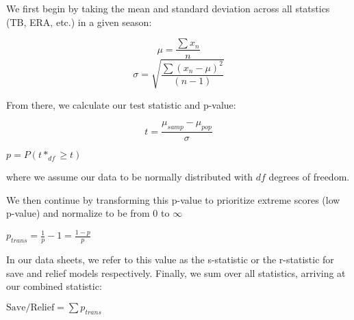 We first begin by taking the mean and standard deviation across all statstics (TB, ERA, etc.) in a given season:

$$\mu = \frac{\sum x_n}{n}$$
$$\sigma = \sqrt{\frac{\sum(x_n-\mu)^2}{(n-1)}}$$

From there, we calculate our test statistic and p-value:

$$t = \frac{\mu_{samp} - \mu_{pop}}{\sigma}$$

$p = P(t*_{df}\geq t)$

where we assume our data to be normally distributed with $df$ degrees of freedom.

We then continue by transforming this p-value to prioritize extreme scores (low p-value) and normalize to be from $0$ to $\infty$

$p_{trans} = \frac 1p - 1 = \frac{1-p}{p}$

In our data sheets, we refer to this value as the s-statistic or the r-statistic for save and relief models respectively. Finally, we sum over all statistics, arriving at our combined statistic:

$\boxed{\text{Save}/\text{Relief} = \sum p_{trans}}$

